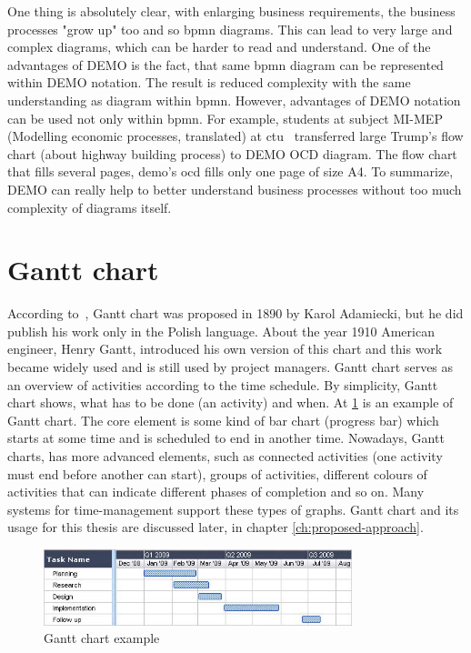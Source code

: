 One thing is absolutely clear, with enlarging business requirements, the business processes "grow up" too and so \gls{bpmn} diagrams. This can lead to very large and complex diagrams, which can be harder to read and understand. One of the advantages of DEMO is the fact, that same \gls{bpmn} diagram can be represented within DEMO notation. The result is reduced complexity with the same understanding as diagram within \gls{bpmn}. However, advantages of DEMO notation can be used not only within \gls{bpmn}. For example, students at subject MI-MEP (Modelling economic processes, translated) at \gls{ctu}~\cite{ccmi-2018} transferred large Trump's flow chart\cite{quartz-trump-2017} (about highway building process) to DEMO OCD diagram. The flow chart that fills several pages, \gls{demo}'s \gls{ocd} fills only one page of size A4. 
To summarize, DEMO can really help to better understand business processes without too much complexity of diagrams itself.
\section{Gantt chart}
According to~\cite{gantt-chart-2018}, Gantt chart was proposed in 1890 by Karol Adamiecki, but he did publish his work only in the Polish language. About the year 1910 American engineer, Henry Gantt, introduced his own version of this chart and this work became widely used and is still used by project managers. 
Gantt chart serves as an overview of activities according to the time schedule. By simplicity, Gantt chart shows, what has to be done (an activity) and when.
At \cref{fig:gantt-chart-example} is an example of Gantt chart. The core element is some kind of bar chart (progress bar) which starts at some time and is scheduled to end in another time.
Nowadays, Gantt charts, has more advanced elements, such as connected activities (one activity must end before another can start), groups of activities, different colours of activities that can indicate different phases of completion and so on. Many systems for time-management support these types of graphs.
Gantt chart and its usage for this thesis are discussed later, in chapter \cref{ch:proposed-approach}.

\begin{figure}[ht!]
	\centering
    \includegraphics[width=0.8\textwidth]{img/gantt-chart-example.jpg}
    \caption{Gantt chart example \cite{gantt-chart-2018}}
    \label{fig:gantt-chart-example}
\end{figure}

